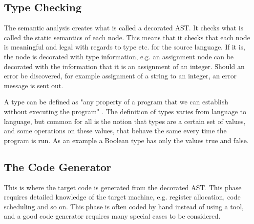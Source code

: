 \subsection{Type Checking}
The semantic analysis creates what is called a decorated AST. It checks what is called the static semantics of each node. This means that it checks that each node is meaningful and legal with regards to type etc. for the source language. If it is, the node is decorated with type information, e.g. an assignment node can be decorated with the information that it is an assignment of an integer. Should an error be discovered, for example assignment of a string to an integer, an error message is sent out. 

A type can be defined as "any property of a program that we can establish without executing the program" \cite{Krishnamurthi2007}. The definition of types varies from language to language, but common for all is the notion that types are a certain set of values, and some operations on these values, that behave the same every time the program is run. As an example a Boolean type has only the values true and false. 

\subsection{The Code Generator}
This is where the target code is generated from the decorated AST. This phase requires detailed knowledge of the target machine, e.g. register allocation, code scheduling and so on. This phase is often coded by hand instead of using a tool, and a good code generator requires many special cases to be considered.
